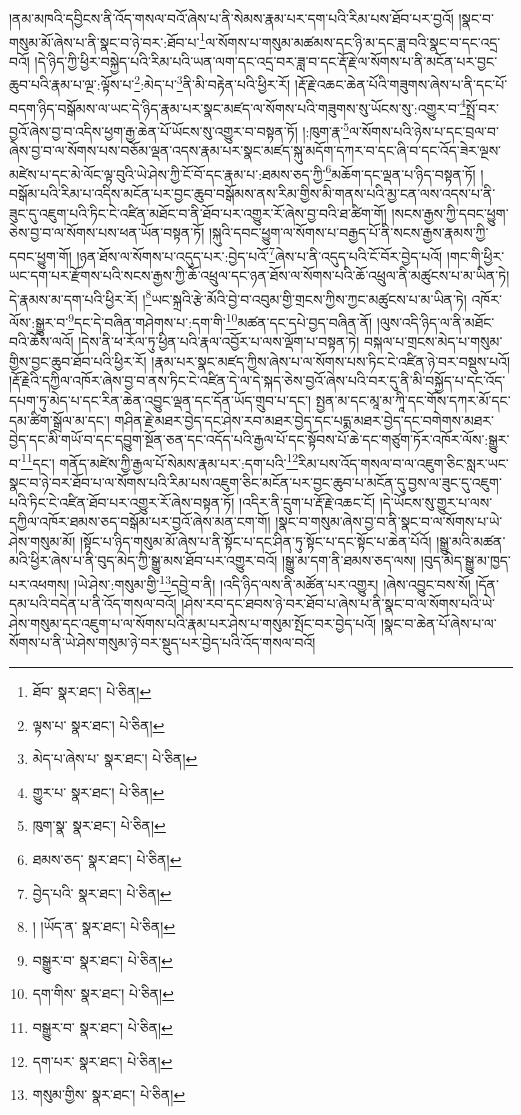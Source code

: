 །ནམ་མཁའི་དབྱིངས་ནི་འོད་གསལ་བའོ་ཞེས་པ་ནི་སེམས་རྣམ་པར་དག་པའི་རིམ་པས་ཐོབ་པར་བྱའོ། །སྣང་བ་གསུམ་མོ་ཞེས་པ་ནི་སྣང་བ་ཉེ་བར་:ཐོབ་པ་\footnote{ཐོབ་  སྣར་ཐང་།  པེ་ཅིན། }ལ་སོགས་པ་གསུམ་མཚམས་དང་ཉི་མ་དང་ཟླ་བའི་སྣང་བ་དང་འདྲ་བའོ། །དེ་ཉིད་ཀྱི་ཕྱིར་བསྐྱེད་པའི་རིམ་པའི་ཡན་ལག་དང་འདྲ་བར་ཟླ་བ་དང་རྡོ་རྗེ་ལ་སོགས་པ་ནི་མངོན་པར་བྱང་ཆུབ་པའི་རྣམ་པ་ལྔ་:ལྟོས་པ་\footnote{ལྟས་པ་  སྣར་ཐང་།  པེ་ཅིན། }:མེད་པ་\footnote{མེད་པ་ཞེས་པ་  སྣར་ཐང་།  པེ་ཅིན། }ནི་མི་བརྟེན་པའི་ཕྱིར་རོ། །རྡོ་རྗེ་འཆང་ཆེན་པོའི་གཟུགས་ཞེས་པ་ནི་དང་པོ་བདག་ཉིད་བསྒོམས་ལ་ཡང་དེ་ཉིད་རྣམ་པར་སྣང་མཛད་ལ་སོགས་པའི་གཟུགས་སུ་ཡོངས་སུ་:འགྱུར་བ་\footnote{གྱུར་པ་  སྣར་ཐང་།  པེ་ཅིན། }སྤྲོ་བར་བྱའོ་ཞེས་བྱ་བ་འདིས་ཕྱག་རྒྱ་ཆེན་པོ་ཡོངས་སུ་འགྱུར་བ་བསྟན་ཏོ། །:ཁུག་རྣ་\footnote{ཁུག་སྣ་  སྣར་ཐང་།  པེ་ཅིན། }ལ་སོགས་པའི་ཉེས་པ་དང་བྲལ་བ་ཞེས་བྱ་བ་ལ་སོགས་པས་བཅོམ་ལྡན་འདས་རྣམ་པར་སྣང་མཛད་སྐུ་མདོག་དཀར་བ་དང་ཞི་བ་དང་འོད་ཟེར་ལྔས་མཛེས་པ་དང་མེ་ལོང་ལྟ་བུའི་ཡེ་ཤེས་ཀྱི་ངོ་བོ་དང་རྣམ་པ་:ཐམས་ཅད་ཀྱི་\footnote{ཐམས་ཅད་  སྣར་ཐང་།  པེ་ཅིན། }མཆོག་དང་ལྡན་པ་ཉིད་བསྟན་ཏོ། །བསྒོམ་པའི་རིམ་པ་འདིས་མངོན་པར་བྱང་ཆུབ་བསྒོམས་ནས་རིམ་གྱིས་མི་གནས་པའི་མྱ་ངན་ལས་འདས་པ་ནི་ཟུང་དུ་འཇུག་པའི་ཏིང་ངེ་འཛིན་མཐོང་བ་ནི་ཐོབ་པར་འགྱུར་རོ་ཞེས་བྱ་བའི་ཐ་ཚིག་གོ། །སངས་རྒྱས་ཀྱི་དབང་ཕྱུག་ཅེས་བྱ་བ་ལ་སོགས་པས་ཕན་ཡོན་བསྟན་ཏོ། །སྐུའི་དབང་ཕྱུག་ལ་སོགས་པ་བརྒྱད་པོ་ནི་སངས་རྒྱས་རྣམས་ཀྱི་དབང་ཕྱུག་གོ། །ཉན་ཐོས་ལ་སོགས་པ་འདུད་པར་:བྱེད་པའོ་\footnote{བྱེད་པའི་  སྣར་ཐང་།  པེ་ཅིན། }ཞེས་པ་ནི་འདུད་པའི་ངོ་བོར་བྱེད་པའོ། །གང་གི་ཕྱིར་ཡང་དག་པར་རྫོགས་པའི་སངས་རྒྱས་ཀྱི་ཆོ་འཕྲུལ་དང་ཉན་ཐོས་ལ་སོགས་པའི་ཆོ་འཕྲུལ་ནི་མཚུངས་པ་མ་ཡིན་ཏེ། དེ་རྣམས་མ་དག་པའི་ཕྱིར་རོ། །\footnote{། །ཡོད་ན་  སྣར་ཐང་།  པེ་ཅིན། }ཡང་སྐྲའི་རྩེ་མོའི་བྱེ་བ་འབུམ་གྱི་གྲངས་ཀྱིས་ཀྱང་མཚུངས་པ་མ་ཡིན་ཏེ། འཁོར་ལོས་:སྒྱུར་བ་\footnote{བསྒྱུར་བ་  སྣར་ཐང་།  པེ་ཅིན། }དང་དེ་བཞིན་གཤེགས་པ་:དག་གི་\footnote{དག་གིས་  སྣར་ཐང་།  པེ་ཅིན། }མཚན་དང་དཔེ་བྱད་བཞིན་ནོ། །ལུས་འདི་ཉིད་ལ་ནི་མཐོང་བའི་ཆོས་ལའོ། །དེས་ནི་ཕ་རོལ་ཏུ་ཕྱིན་པའི་རྣལ་འབྱོར་པ་ལས་ལྡོག་པ་བསྟན་ཏེ། བསྐལ་པ་གྲངས་མེད་པ་གསུམ་གྱིས་བྱང་ཆུབ་ཐོབ་པའི་ཕྱིར་རོ། །རྣམ་པར་སྣང་མཛད་ཀྱིས་ཞེས་པ་ལ་སོགས་པས་ཏིང་ངེ་འཛིན་ཉེ་བར་བསྡུས་པའོ། །རྡོ་རྗེའི་དཀྱིལ་འཁོར་ཞེས་བྱ་བ་ནས་ཏིང་ངེ་འཛིན་དེ་ལ་དེ་སྐད་ཅེས་བྱའོ་ཞེས་པའི་བར་དུ་ནི་མི་བསྐྱོད་པ་དང་འོད་དཔག་ཏུ་མེད་པ་དང་རིན་ཆེན་འབྱུང་ལྡན་དང་དོན་ཡོད་གྲུབ་པ་དང་། སྤྱན་མ་དང་མཱ་མ་ཀཱི་དང་གོས་དཀར་མོ་དང་དམ་ཚིག་སྒྲོལ་མ་དང་། གཤིན་རྗེ་མཐར་བྱེད་དང་ཤེས་རབ་མཐར་བྱེད་དང་པདྨ་མཐར་བྱེད་དང་བགེགས་མཐར་བྱེད་དང་མི་གཡོ་བ་དང་དབྱུག་སྔོན་ཅན་དང་འདོད་པའི་རྒྱལ་པོ་དང་སྟོབས་པོ་ཆེ་དང་གཙུག་ཏོར་འཁོར་ལོས་:སྒྱུར་བ་\footnote{བསྒྱུར་བ་  སྣར་ཐང་།  པེ་ཅིན། }དང་། གནོད་མཛེས་ཀྱི་རྒྱལ་པོ་སེམས་རྣམ་པར་:དག་པའི་\footnote{དག་པར་  སྣར་ཐང་།  པེ་ཅིན། }རིམ་པས་འོད་གསལ་བ་ལ་འཇུག་ཅིང་སླར་ཡང་སྣང་བ་ཉེ་བར་ཐོབ་པ་ལ་སོགས་པའི་རིམ་པས་འཇུག་ཅིང་མངོན་པར་བྱང་ཆུབ་པ་མངོན་དུ་བྱས་ལ་ཟུང་དུ་འཇུག་པའི་ཏིང་ངེ་འཛིན་ཐོབ་པར་འགྱུར་རོ་ཞེས་བསྟན་ཏོ། །འདིར་ནི་དྲུག་པ་རྡོ་རྗེ་འཆང་ངོ། །དེ་ཡོངས་སུ་གྱུར་པ་ལས་དཀྱིལ་འཁོར་ཐམས་ཅད་བསྒོམ་པར་བྱའོ་ཞེས་མན་ངག་གོ། །སྣང་བ་གསུམ་ཞེས་བྱ་བ་ནི་སྣང་བ་ལ་སོགས་པ་ཡེ་ཤེས་གསུམ་མོ། །སྟོང་པ་ཉིད་གསུམ་མོ་ཞེས་པ་ནི་སྟོང་པ་དང་ཤིན་ཏུ་སྟོང་པ་དང་སྟོང་པ་ཆེན་པོའོ། །སྒྱུ་མའི་མཚན་མའི་ཕྱིར་ཞེས་པ་ནི་བུད་མེད་ཀྱི་སྒྱུ་མས་ཐོབ་པར་འགྱུར་བའོ། །སྒྱུ་མ་དག་ནི་ཐམས་ཅད་ལས། །བུད་མེད་སྒྱུ་མ་ཁྱད་པར་འཕགས། །ཡེ་ཤེས་:གསུམ་གྱི་\footnote{གསུམ་གྱིས་  སྣར་ཐང་།  པེ་ཅིན། }དབྱེ་བ་ནི། །འདི་ཉིད་ལས་ནི་མཚོན་པར་འགྱུར། །ཞེས་འབྱུང་བས་སོ། །དོན་དམ་པའི་བདེན་པ་ནི་འོད་གསལ་བའོ། །ཤེས་རབ་དང་ཐབས་ཉེ་བར་ཐོབ་པ་ཞེས་པ་ནི་སྣང་བ་ལ་སོགས་པའི་ཡེ་ཤེས་གསུམ་དང་འཇུག་པ་ལ་སོགས་པའི་རྣམ་པར་ཤེས་པ་གསུམ་སྤོང་བར་བྱེད་པའོ། །སྣང་བ་ཆེན་པོ་ཞེས་པ་ལ་སོགས་པ་ནི་ཡེ་ཤེས་གསུམ་ཉེ་བར་སྡུད་པར་བྱེད་པའི་འོད་གསལ་བའོ། 